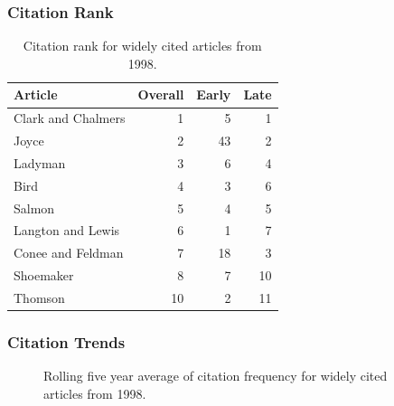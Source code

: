 \documentclass[
  10pt,
  letterpaper,
  DIV=11,
  numbers=noendperiod,
  twoside]{scrartcl}
\begin{document}
\subsubsection*{Citation Rank}\label{sec-rank-1998}

\begin{longtable}[]{@{}lrrr@{}}

\caption{\label{tbl-citation-rank-1998}Citation rank for widely cited
articles from 1998.}

\tabularnewline

\toprule\noalign{}
Article & Overall & Early & Late \\
\midrule\noalign{}
\endhead
\bottomrule\noalign{}
\endlastfoot
Clark and Chalmers & 1 & 5 & 1 \\
Joyce & 2 & 43 & 2 \\
Ladyman & 3 & 6 & 4 \\
Bird & 4 & 3 & 6 \\
Salmon & 5 & 4 & 5 \\
Langton and Lewis & 6 & 1 & 7 \\
Conee and Feldman & 7 & 18 & 3 \\
Shoemaker & 8 & 7 & 10 \\
Thomson & 10 & 2 & 11 \\

\end{longtable}

\subsubsection*{Citation Trends}\label{sec-trends-1998}

\begin{figure}


\caption{\label{fig-citation-spaghetti-1998}Rolling five year average of
citation frequency for widely cited articles from 1998.}

\end{figure}%
\end{document}
